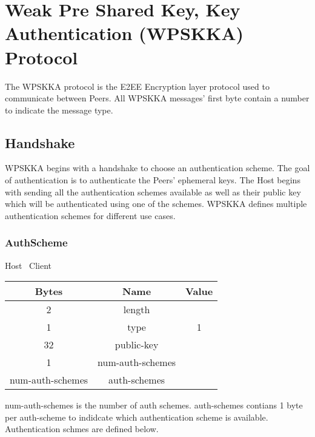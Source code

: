 \section{Weak Pre Shared Key, Key Authentication (WPSKKA) Protocol}

The WPSKKA protocol is the E2EE Encryption layer protocol used to communicate between Peers. All WPSKKA messages'
first byte contain a number to indicate
the message type.\\

\subsection{Handshake}

WPSKKA begins with a handshake to choose an authentication scheme. The goal of authentication is to authenticate the Peers' ephemeral keys. The Host begins with sending all the authentication schemes available as well as their public key which will be authenticated using one of the schemes. WPSKKA defines multiple authentication schemes for different use cases.

\subsubsection{AuthScheme}

\begin{center}
    Host \textrightarrow\ Client\\
    \begin{tabular}{|c|c|c|}
        \hline
        \textbf{Bytes}   & \textbf{Name}    & \textbf{Value} \\
        \hline
        2                & length           &                \\
        \hline
        1                & type             & 1              \\
        \hline
        32               & public-key       &                \\
        \hline
        1                & num-auth-schemes &                \\
        \hline
        num-auth-schemes & auth-schemes     &                \\
        \hline
    \end{tabular}
\end{center}

num-auth-schemes is the number of auth schemes. auth-schemes contians 1 byte per auth-scheme to indidcate which authentication scheme is available. Authentication schmes are defined below.\\

